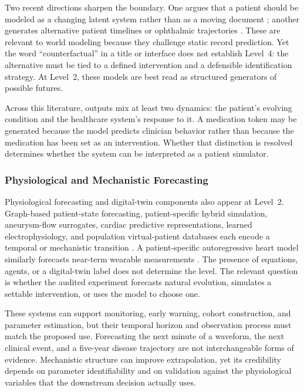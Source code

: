 Two recent directions sharpen the boundary. One argues that a patient should be modeled as a changing latent system rather than as a moving document \citep{Adam2026Patientisnot}; another generates alternative patient timelines or ophthalmic trajectories \citep{Akagi2026GeneratingCounterfactualPatient,Belligoli2026OphthadtGenerativeDigital}. These are relevant to world modeling because they challenge static record prediction. Yet the word ``counterfactual'' in a title or interface does not establish Level~4: the alternative must be tied to a defined intervention and a defensible identification strategy. At Level~2, these models are best read as structured generators of possible futures.

Across this literature, outputs mix at least two dynamics: the patient's evolving condition and the healthcare system's response to it. A medication token may be generated because the model predicts clinician behavior rather than because the medication has been set as an intervention. Whether that distinction is resolved determines whether the system can be interpreted as a patient simulator.

\subsubsection{Physiological and Mechanistic Forecasting}

Physiological forecasting and digital-twin components also appear at Level~2. Graph-based patient-state forecasting, patient-specific hybrid simulation, aneurysm-flow surrogates, cardiac predictive representations, learned electrophysiology, and population virtual-patient databases each encode a temporal or mechanistic transition \citep{Barbiero2021GraphRepresentationForecasting,Sharma2025PatientSpecificDigital,Garnier2025GraphDeepLearning,Fernandes2026BeyondPatientInvariance,Zhou2026LearningCardiacElectrophysiology,Weber2026SyntheticPopulationBased}. A patient-specific autoregressive heart model similarly forecasts near-term wearable measurements \citep{Wickramasinghe2025HeartTwin}. The presence of equations, agents, or a digital-twin label does not determine the level. The relevant question is whether the audited experiment forecasts natural evolution, simulates a settable intervention, or uses the model to choose one.

These systems can support monitoring, early warning, cohort construction, and parameter estimation, but their temporal horizon and observation process must match the proposed use. Forecasting the next minute of a waveform, the next clinical event, and a five-year disease trajectory are not interchangeable forms of evidence. Mechanistic structure can improve extrapolation, yet its credibility depends on parameter identifiability and on validation against the physiological variables that the downstream decision actually uses.

